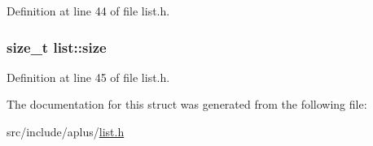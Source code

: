 Definition at line 44 of file list.\+h.

\hypertarget{structlist_ae581be90bd8eb7051528b61ad216de88}{
\subsubsection[{size}]{\setlength{\rightskip}{0pt plus 5cm}size\+\_\+t list\+::size}}\label{structlist_ae581be90bd8eb7051528b61ad216de88}


Definition at line 45 of file list.\+h.



The documentation for this struct was generated from the following file\+:\begin{DoxyCompactItemize}
\item 
src/include/aplus/\hyperlink{list_8h}{list.\+h}\end{DoxyCompactItemize}
